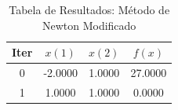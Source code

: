 \documentclass[a4paper,12pt,utf8x,notitlepage]{article}
\begin{document}
\begin{table}[!htcb]
  \centering
  \begin{tabular}{|c|c|c|c|}
    \hline
    \rowcolor{kugray5}{}
    Iter  & $x(1)$ & $x(2)$ & $f(x)$\\ \hline
	0 & -2.0000  & 	1.0000	& 27.0000\\ \hline
	\rowcolor{red!40}{}	
	1 &  1.0000	 & 1.0000	& 0.0000\\ \hline
  \end{tabular}
  \caption{Tabela de Resultados: Método de Newton Modificado}
  \label{tab:res_newtonmod}
\end{table}

\begin{figure}[!htcb]
\centering
{}
\quad
{}
\end{figure}
\end{document}
